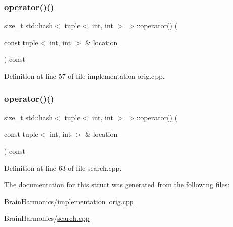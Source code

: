 \subsubsection{\texorpdfstring{operator()()}{operator()()}\hspace{0.1cm}{\footnotesize\ttfamily [1/2]}}
{\footnotesize\ttfamily size\+\_\+t std\+::hash$<$ tuple$<$ int, int $>$ $>$\+::operator() (\begin{DoxyParamCaption}\item[{const tuple$<$ int, int $>$ \&}]{location }\end{DoxyParamCaption}) const\hspace{0.3cm}{\ttfamily [inline]}}



Definition at line 57 of file implementation orig.\+cpp.

\mbox{\label{structstd_1_1hash_3_01tuple_3_01int_00_01int_01_4_01_4_af46854ec2c5aa6cd6d1cd164374bd54f}} 
\subsubsection{\texorpdfstring{operator()()}{operator()()}\hspace{0.1cm}{\footnotesize\ttfamily [2/2]}}
{\footnotesize\ttfamily size\+\_\+t std\+::hash$<$ tuple$<$ int, int $>$ $>$\+::operator() (\begin{DoxyParamCaption}\item[{const tuple$<$ int, int $>$ \&}]{location }\end{DoxyParamCaption}) const\hspace{0.3cm}{\ttfamily [inline]}}



Definition at line 63 of file search.\+cpp.



The documentation for this struct was generated from the following files\+:\begin{DoxyCompactItemize}
\item 
Brain\+Harmonics/\mbox{\hyperlink{implementation_01orig_8cpp}{implementation orig.\+cpp}}\item 
Brain\+Harmonics/\mbox{\hyperlink{search_8cpp}{search.\+cpp}}\end{DoxyCompactItemize}
